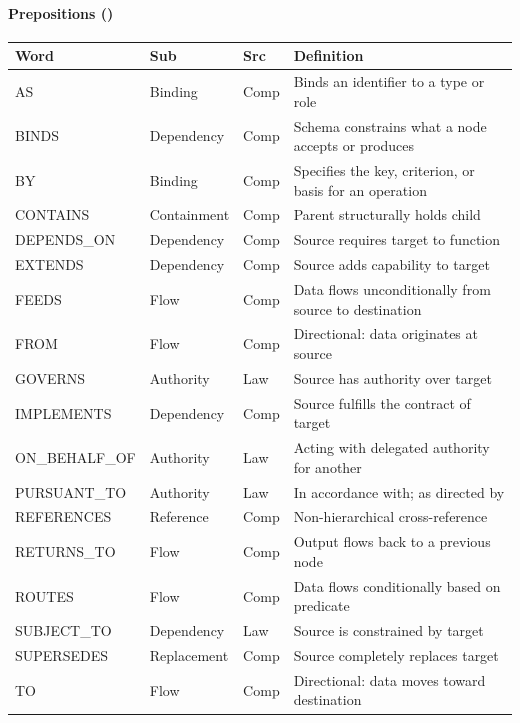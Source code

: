 \documentclass{article}
\begin{document}
\paragraph{Prepositions (\VocabPrepositions)}
\small
\begin{tabular}{lllp{7cm}}
\toprule \textbf{Word} & \textbf{Sub} & \textbf{Src} & \textbf{Definition} \\ \midrule
AS & Binding & Comp & Binds an identifier to a type or role \\
BINDS & Dependency & Comp & Schema constrains what a node accepts or produces \\
BY & Binding & Comp & Specifies the key, criterion, or basis for an operation \\
CONTAINS & Containment & Comp & Parent structurally holds child \\
DEPENDS\_ON & Dependency & Comp & Source requires target to function \\
EXTENDS & Dependency & Comp & Source adds capability to target \\
FEEDS & Flow & Comp & Data flows unconditionally from source to destination \\
FROM & Flow & Comp & Directional: data originates at source \\
GOVERNS & Authority & Law & Source has authority over target \\
IMPLEMENTS & Dependency & Comp & Source fulfills the contract of target \\
ON\_BEHALF\_OF & Authority & Law & Acting with delegated authority for another \\
PURSUANT\_TO & Authority & Law & In accordance with; as directed by \\
REFERENCES & Reference & Comp & Non-hierarchical cross-reference \\
RETURNS\_TO & Flow & Comp & Output flows back to a previous node \\
ROUTES & Flow & Comp & Data flows conditionally based on predicate \\
SUBJECT\_TO & Dependency & Law & Source is constrained by target \\
SUPERSEDES & Replacement & Comp & Source completely replaces target \\
TO & Flow & Comp & Directional: data moves toward destination \\
\bottomrule
\end{tabular}
\normalsize
\end{document}
